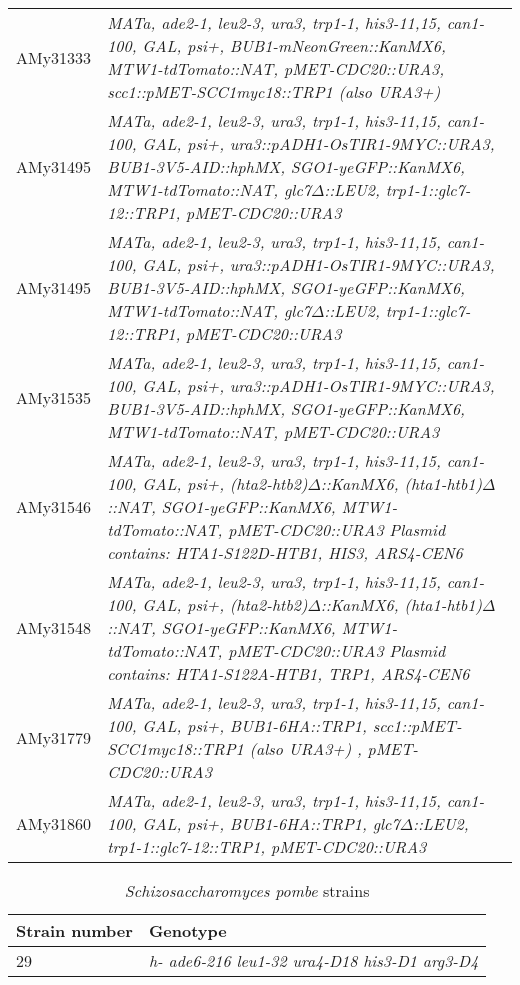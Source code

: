 \begin{longtable}{p{}p{}}
AMy31333        & \textit{MATa, ade2-1, leu2-3, ura3,   trp1-1, his3-11,15, can1-100, GAL, psi+, BUB1-mNeonGreen::KanMX6,   MTW1-tdTomato::NAT, pMET-CDC20::URA3, scc1::pMET-SCC1myc18::TRP1 (also URA3+)}                                                               \\
AMy31495        & \textit{MATa, ade2-1, leu2-3, ura3,   trp1-1, his3-11,15, can1-100, GAL, psi+, ura3::pADH1-OsTIR1-9MYC::URA3,   BUB1-3V5-AID::hphMX, SGO1-yeGFP::KanMX6, MTW1-tdTomato::NAT, glc7$\Delta$::LEU2,   trp1-1::glc7-12::TRP1, pMET-CDC20::URA3}                   \\
AMy31495        & \textit{MATa, ade2-1, leu2-3, ura3,   trp1-1, his3-11,15, can1-100, GAL, psi+, ura3::pADH1-OsTIR1-9MYC::URA3,   BUB1-3V5-AID::hphMX, SGO1-yeGFP::KanMX6, MTW1-tdTomato::NAT, glc7$\Delta$::LEU2,   trp1-1::glc7-12::TRP1, pMET-CDC20::URA3}                   \\
AMy31535        & \textit{MATa, ade2-1, leu2-3, ura3,   trp1-1, his3-11,15, can1-100, GAL, psi+, ura3::pADH1-OsTIR1-9MYC::URA3,   BUB1-3V5-AID::hphMX, SGO1-yeGFP::KanMX6, MTW1-tdTomato::NAT, pMET-CDC20::URA3}                                                         \\
AMy31546        & \textit{MATa, ade2-1, leu2-3, ura3,   trp1-1, his3-11,15, can1-100, GAL, psi+, (hta2-htb2)$\Delta$::KanMX6,  (hta1-htb1)$\Delta$::NAT, SGO1-yeGFP::KanMX6,   MTW1-tdTomato::NAT, pMET-CDC20::URA3 Plasmid contains: HTA1-S122D-HTB1, HIS3,   ARS4-CEN6}              \\
AMy31548        & \textit{MATa, ade2-1, leu2-3, ura3,   trp1-1, his3-11,15, can1-100, GAL, psi+, (hta2-htb2)$\Delta$::KanMX6,  (hta1-htb1)$\Delta$::NAT, SGO1-yeGFP::KanMX6,   MTW1-tdTomato::NAT, pMET-CDC20::URA3 Plasmid contains: HTA1-S122A-HTB1, TRP1,   ARS4-CEN6}              \\
AMy31779        & \textit{MATa, ade2-1, leu2-3, ura3,   trp1-1, his3-11,15, can1-100, GAL, psi+, BUB1-6HA::TRP1,   scc1::pMET-SCC1myc18::TRP1 (also URA3+) , pMET-CDC20::URA3}                                                                                           \\
AMy31860        & \textit{MATa, ade2-1, leu2-3, ura3,   trp1-1, his3-11,15, can1-100, GAL, psi+, BUB1-6HA::TRP1, glc7$\Delta$::LEU2,   trp1-1::glc7-12::TRP1, pMET-CDC20::URA3}
\end{longtable}

\begin{table}[htb]
\centering
\renewcommand{\arraystretch}{1.5}
\caption{\textit{Schizosaccharomyces pombe} strains}
\label{tab:pombetable}
\begin{tabular}{p{}p{}}
\hline
\textbf{Strain number} & \textbf{Genotype}
\\
\hline
29 & \textit{h- ade6-216 leu1-32 ura4-D18 his3-D1 arg3-D4}
\\
\hline                                                             
\end{tabular}
\end{table}

